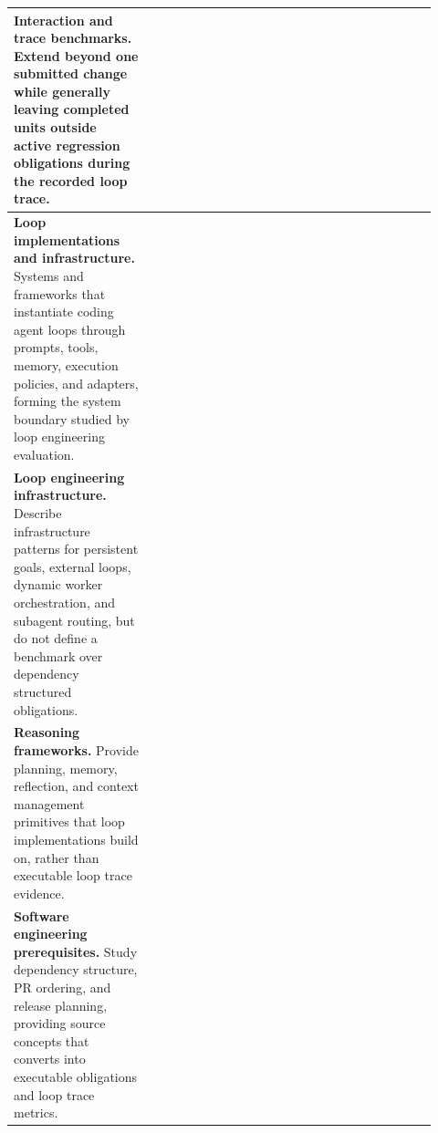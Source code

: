 \begin{table}[!ht]
\begin{tabular}{@{}p{0.30\linewidth} p{0.62\linewidth}@{}}
    \textbf{Interaction and trace benchmarks.}
    Extend beyond one submitted change while generally leaving completed units outside active regression obligations during the recorded loop trace.
      & \citet{kwa2025measuring,siegel2024core,li2024devbench,merrill2026terminal,edwards2025rexbench,chen2026beyondswe,vijayvargiya2025interactive} \\
    \midrule

    \textbf{Loop implementations and infrastructure.}
    Systems and frameworks that instantiate coding agent loops through prompts, tools, memory, execution policies, and adapters, forming the system boundary studied by loop engineering evaluation.
      & \citet{claude_code,codex,devin,wang2024openhands,yang2024sweagent,swe_agent,autocoderover,agentless,copilot_cloud_agent,huntley_ralph_wiggum} \\
    \midrule

    \textbf{Loop engineering infrastructure.}
    Describe infrastructure patterns for persistent goals, external loops, dynamic worker orchestration, and subagent routing, but do not define a benchmark over dependency structured obligations.
      & \citet{openai_codex_prompting,anthropic_claude_code_goal,anthropic_claude_code_workflows,anthropic_claude_code_subagents,huntley_ralph_loop} \\
    \midrule
    \textbf{Reasoning frameworks.}
    Provide planning, memory, reflection, and context management primitives that loop implementations build on, rather than executable loop trace evidence.
      & \citet{yao2023tree,besta2024graph,shinn2023reflexion,hong2023metagpt,wu2024autogen,wang2023voyager,packer2023memgpt} \\
    \midrule
    \textbf{Software engineering prerequisites.}
    Study dependency structure, PR ordering, and release planning, providing source concepts that \lhb{} converts into executable obligations and loop trace metrics.
      & \citet{lehnert2011taxonomy,tu2002evolution,costa2016framework,valdivia2018characterizing,ruhe2005art} \\
    \bottomrule
  \end{tabular}
\end{table}
\FloatBarrier
